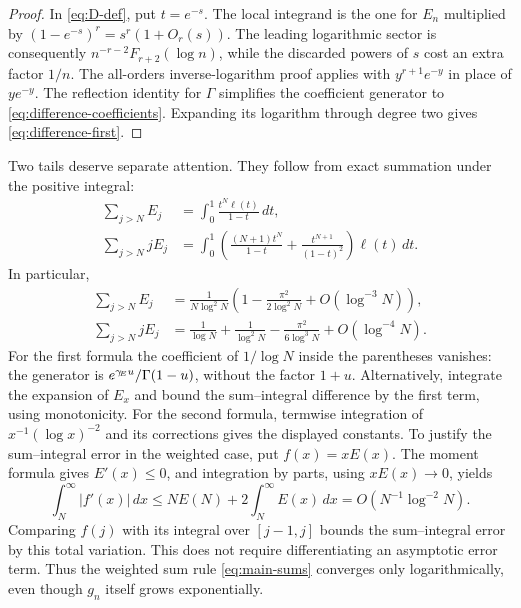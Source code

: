 \begin{proof}
In \eqref{eq:D-def}, put $t=e^{-s}$. The local integrand is the
one for $E_n$ multiplied by $(1-e^{-s})^r=s^r(1+O_r(s))$.
The leading logarithmic sector is consequently $n^{-r-2}
F_{r+2}(\log n)$, while the discarded powers of $s$ cost an extra
factor $1/n$. The all-orders inverse-logarithm proof applies with
$y^{r+1}e^{-y}$ in place of $ye^{-y}$. The reflection identity for
$\Gamma$ simplifies the coefficient generator to
\eqref{eq:difference-coefficients}. Expanding its logarithm through
degree two gives \eqref{eq:difference-first}.
\end{proof}

Two tails deserve separate attention. They follow from exact summation
under the positive integral:
\begin{align}\label{eq:tail-integrals}
 \sum_{j>N}E_j&=\int_0^1\frac{t^N\ell(t)}{1-t}\,dt,\nonumber\\
 \sum_{j>N}jE_j&=\int_0^1
  \left(\frac{(N+1)t^N}{1-t}+\frac{t^{N+1}}{(1-t)^2}\right)
                    \ell(t)\,dt.
\end{align}
In particular,
\begin{align}\label{eq:tails-leading}
 \sum_{j>N}E_j
 &=\frac1{N\log^2N}
    \left(1-\frac{\pi^2}{2\log^2N}+O(\log^{-3}N)\right),\nonumber\\
 \sum_{j>N}jE_j
 &=\frac1{\log N}+\frac1{\log^2N}
           -\frac{\pi^2}{6\log^3N}+O(\log^{-4}N).
\end{align}
For the first formula the coefficient of $1/\log N$ inside the
parentheses vanishes: the generator is
$e^{\gamma_{\!E} u}/\Gamma(1-u)$, without the factor $1+u$.
Alternatively, integrate the expansion of $E_x$ and bound the
sum--integral difference by the first term, using monotonicity.
For the second formula, termwise integration of
$x^{-1}(\log x)^{-2}$ and its corrections gives the displayed
constants. To justify the sum--integral error in the weighted case,
put $f(x)=xE(x)$. The moment formula gives $E'(x)\le0$, and
integration by parts, using $xE(x)\to0$, yields
\[
 \int_N^\infty|f'(x)|\,dx
 \le NE(N)+2\int_N^\infty E(x)\,dx
 =O(N^{-1}\log^{-2}N).
\]
Comparing $f(j)$ with its integral over $[j-1,j]$ bounds the
sum--integral error by this total variation. This does not require
differentiating an asymptotic error term.
Thus the weighted sum rule \eqref{eq:main-sums} converges only
logarithmically, even though $g_n$ itself grows exponentially.
